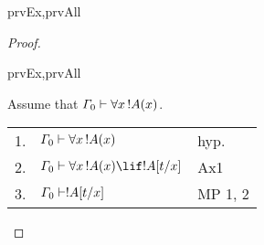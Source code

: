\documentclass[../../include/open-logic-section]{subfiles}
\begin{document}
\begin{thm} 
\begin{tagenumerate}{prvEx,prvAll} 

\end{tagenumerate} 
\end{thm}

\begin{proof} \begin{tagenumerate}{prvEx,prvAll} 

 {Assume that  $\Gamma_0 \Proves \lforall[x][!A(x)]$.

\begin{tabular}{rll} 
1. & $\Gamma_0 \Proves \lforall[x][!A(x)]$ & hyp. \\
2. & $\Gamma_0 \Proves \lforall[x][!A(x)] \lif \Subst{!A}{t}{x}$ & Ax1 \\ 
3. & $\Gamma_0 \Proves \Subst{!A}{t}{x}$ & MP 1, 2 \\ 
\end{tabular}}{}

\end{tagenumerate} 
\end{proof}
\end{document}

